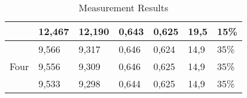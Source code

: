\begin{table}[h]
\begin{tabular}{c|l|l|l|l|ll}
\multicolumn{1}{|c|}{}                      & 12,467           & 12,190           & 0,643              & 0,625              & \multicolumn{1}{l|}{19,5}                  & \multicolumn{1}{l|}{15\%}                   \\ \hline
\multicolumn{1}{|c|}{\multirow{3}{*}{Four}} & 9,566            & 9,317            & 0,646              & 0,624              & \multicolumn{1}{l|}{14,9}                  & \multicolumn{1}{l|}{35\%}                   \\ \cline{2-7} 
\multicolumn{1}{|c|}{}                      & 9,556            & 9,309            & 0,646              & 0,625              & \multicolumn{1}{l|}{14,9}                  & \multicolumn{1}{l|}{35\%}                   \\ \cline{2-7} 
\multicolumn{1}{|c|}{}                      & 9,533            & 9,298            & 0,644              & 0,625              & \multicolumn{1}{l|}{14,9}                  & \multicolumn{1}{l|}{35\%}                   \\ \hline
\end{tabular}
\caption{Measurement Results }
\label{tab:MeasurementResults}
\end{table}

